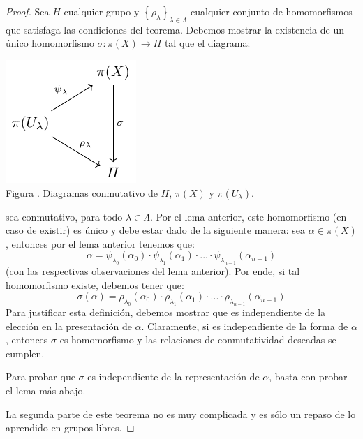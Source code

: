 \documentclass[12pt]{report}
\theoremstyle{largebreak}
\newcommand\cf[3]{\ensuremath{#1:#2\rightarrow#3}}
\newcounter{figcount}
\begin{document}
    \begin{proof}
        Sea $H$ cualquier grupo y $\left\{\rho_\lambda \right\}_{ \lambda\in\Lambda}$ cualquier conjunto de homomorfismos que satisfaga las condiciones del teorema. Debemos mostrar la existencia de un único homomorfismo $\cf{\sigma}{\pi(X)}{H}$ tal que el diagrama:

        \begin{minipage}{\textwidth}
            \begin{center}
                \includegraphics[scale=1.5]{images/fig_5.pdf}\\
                Figura \thefigcount. Diagramas conmutativo de $H$, $\pi(X)$ y $\pi(U_\lambda)$.
            \end{center}
        \end{minipage}

        sea conmutativo, para todo $\lambda\in\Lambda$. Por el lema anterior, este homomorfismo (en caso de existir) es único y debe estar dado de la siguiente manera: sea $\alpha\in\pi(X)$, entonces por el lema anterior tenemos que:
        \begin{equation*}
            \alpha=\psi_{\lambda_0}(\alpha_0)\cdot\psi_{\lambda_1}(\alpha_1)\cdot...\cdot\psi_{\lambda_ {n-1}}(\alpha_{ n-1})
        \end{equation*}
        (con las respectivas observaciones del lema anterior). Por ende, si tal homomorfismo existe, debemos tener que:
        \begin{equation*}
            \sigma(\alpha)=\rho_{\lambda_0}(\alpha_0)\cdot\rho_{\lambda_1}(\alpha_1)\cdot...\cdot\rho_{\lambda_{ n-1}}(\alpha_{ n-1})
        \end{equation*}
        Para justificar esta definición, debemos mostrar que es independiente de la elección en la presentación de $\alpha$. Claramente, si es independiente de la forma de $\alpha$, entonces $\sigma$ es homomorfismo y las relaciones de conmutatividad deseadas se cumplen.

        Para probar que $\sigma$ es independiente de la representación de $\alpha$, basta con probar el lema más abajo.

        La segunda parte de este teorema no es muy complicada y es sólo un repaso de lo aprendido en grupos libres.
    \end{proof}
\end{document}
